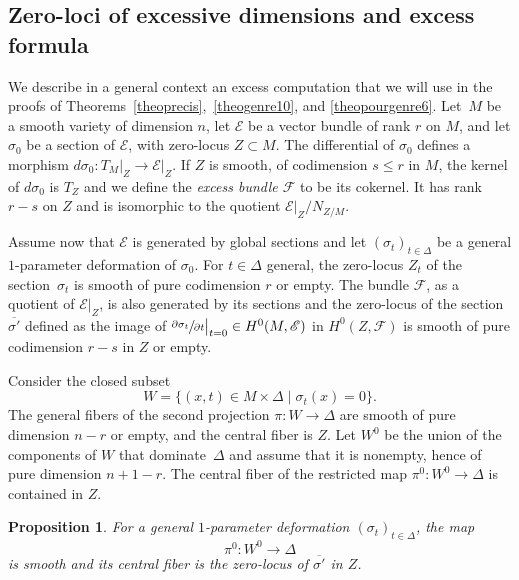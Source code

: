 \documentclass[JEP,XML,SOM,Unicode, NoEqCountersInSection,NoFloatCountersInSection]{cedram}
\let\mathcal\mathscr
\newtheorem{prop}[lemm]{Proposition}
\theoremstyle{definition}
\newcommand\cE{\mathcal{E}}
\newcommand\cF{\mathcal{F}}
\begin{document}
\subsection{Zero-loci of excessive dimensions and excess formula}\label{secexcess}
We describe in a general context an excess computation that we will use in the
proofs of Theorems~\ref{theoprecis},~\ref{theogenre10}, and \ref{theopourgenre6}.
Let~$M$ be a smooth variety of dimension $n$, let $\cE$ be a vector bundle of rank $r$ on $M$, and let
$\sigma_0$ be a section of $\cE$, with zero-locus $Z\subset M$. The differential of $\sigma_0$ defines a morphism $d\sigma_0\colon T_M\vert_Z\to \cE\vert_{Z}$. If $Z$ is smooth, of codimension $s\le r $ in $M$,
the kernel of $d\sigma_0$ is $T_Z$ and we define the \emph{excess bundle $\cF$} to be its cokernel. It has rank $r-s$ on $Z$ and is isomorphic to the quotient $\cE\vert_{Z}/N_{Z/M}$.

Assume now that $\cE$ is generated by global sections and let $(\sigma_t)_{t\in \Delta}$ be a general $1$-parameter deformation of $\sigma_0$. For $t\in \Delta$ general, the zero-locus $Z_t$ of the section~$\sigma_t$ is smooth of pure codimension
$r$ {or empty}. The bundle $\cF$, as a quotient of $\cE\vert_Z$, is also generated by its sections and
the zero-locus of the section
$\overline {\sigma'} $ defined as the image of $\sfrac{\partial\sigma_t}{\partial t} \big\vert_{t=0}\in H^0(M,\cE)$ in
$H^0(Z,\cF)$ is smooth of pure codimension $r-s$ in $Z$ {or empty}.

Consider the closed subset
\begin{equation}\label{eqW}
W=\{(x,t)\in M\times \Delta\mid \sigma_t(x)=0\}.
\end{equation}
The general fibers of the second projection $\pi\colon W\to \Delta$ are smooth of pure dimension
$n-r$ {or empty,} and the central fiber is $Z$. {Let $W^0$ be the union of the components of $W$ that dominate~$\Delta$ and assume that it is nonempty, hence of pure dimension
$n+1-r$}. The central fiber of the restricted map $\pi^0\colon W^0\to \Delta$ is contained in $Z$.

\begin{prop}\label{proexcess}
For a general $1$-parameter deformation $(\sigma_t)_{t\in \Delta}$, the map
\[
\pi^0\colon W^0\to \Delta
\]
is smooth and its central fiber is the zero-locus of $\overline {\sigma'} $ in $Z$.
\end{prop}
\end{document}
